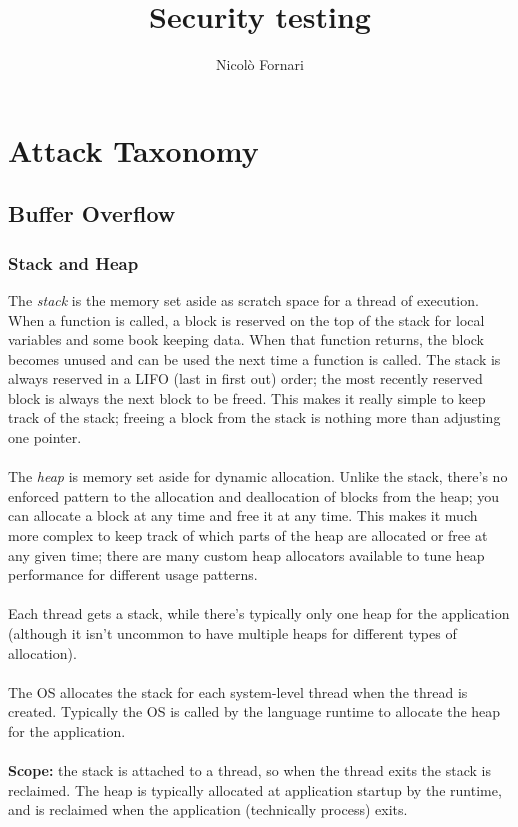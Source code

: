\documentclass[10pt,a4paper]{book}
\author{Nicolò Fornari}
\title{Security testing}
\begin{document}
\chapter{Attack Taxonomy}
\section{Buffer Overflow}
\subsection{Stack and Heap}
The \emph{stack} is the memory set aside as scratch space for a thread of execution. When a function is called, a block is reserved on the top of the stack for local variables and some book keeping data. When that function returns, the block becomes unused and can be used the next time a function is called. The stack is always reserved in a LIFO (last in first out) order; the most recently reserved block is always the next block to be freed. This makes it really simple to keep track of the stack; freeing a block from the stack is nothing more than adjusting one pointer.\\\\
The \emph{heap} is memory set aside for dynamic allocation. Unlike the stack, there's no enforced pattern to the allocation and deallocation of blocks from the heap; you can allocate a block at any time and free it at any time. This makes it much more complex to keep track of which parts of the heap are allocated or free at any given time; there are many custom heap allocators available to tune heap performance for different usage patterns.\\\\
Each thread gets a stack, while there's typically only one heap for the application (although it isn't uncommon to have multiple heaps for different types of allocation).\\\\
The OS allocates the stack for each system-level thread when the thread is created. Typically the OS is called by the language runtime to allocate the heap for the application.\\\\
\textbf{Scope:} the stack is attached to a thread, so when the thread exits the stack is reclaimed. The heap is typically allocated at application startup by the runtime, and is reclaimed when the application (technically process) exits.\\\\
\end{document}
